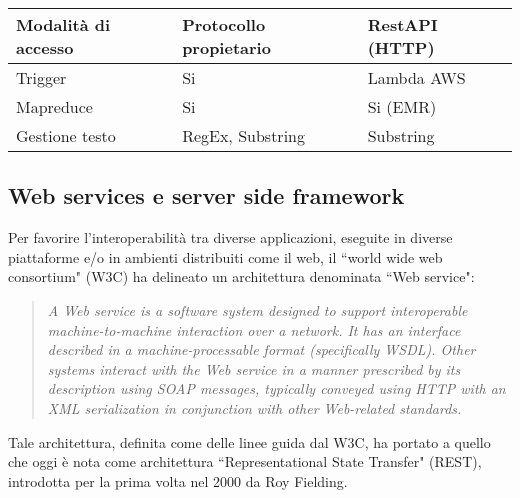 \begin{table}[htb]
\begin{tabular}{|l|l|l|}
Modalità di accesso & Protocollo propietario                                                                                                    & RestAPI (HTTP)                                                                                                              \\ \hline
Trigger             & Si                                                                                                                        & Lambda AWS                                                                                                                  \\ \hline
Mapreduce           & Si                                                                                                                        & Si (EMR)                                                                                                                    \\ \hline
Gestione testo      & RegEx, Substring                                                                                                          & Substring                                                                                                                   \\ \hline
\end{tabular}


\end{table}

\subsection{Web services e server side framework}
Per favorire l'interoperabilità tra diverse applicazioni, eseguite in diverse piattaforme e/o in ambienti distribuiti come il web, il ``world wide web consortium" (W3C) ha delineato un architettura denominata ``Web service": 

\begin{quotation}
\textit{A Web service is a software system designed to support interoperable machine-to-machine interaction over a network. It has an interface described in a machine-processable format (specifically WSDL). Other systems interact with the Web service in a manner prescribed by its description using SOAP messages, typically conveyed using HTTP with an XML serialization in conjunction with other Web-related standards.}
\end{quotation}
Tale architettura, definita come delle linee guida dal W3C, ha portato a quello che oggi è nota come architettura ``Representational State Transfer" (REST), introdotta per la prima volta nel 2000 da Roy Fielding. 

